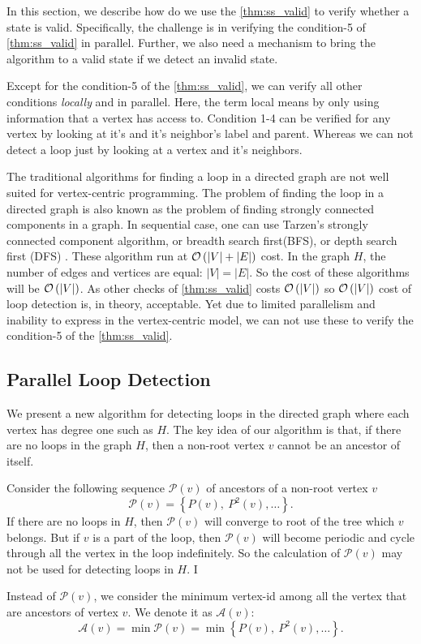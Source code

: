 %

In this section, we describe how do we use the  \cref{thm:ss_valid} to verify
whether a state is valid. Specifically, the challenge is in verifying the
condition-5 of \cref{thm:ss_valid} in parallel. Further, we also need a
mechanism to bring the algorithm to a valid state if we detect an invalid
state.


Except for the condition-5 of the \cref{thm:ss_valid}, we can verify all other
conditions \emph{locally} and in parallel.  Here, the term local means by only
using information that a vertex has access to. Condition 1-4 can be verified
for any vertex by looking at it's  and it's neighbor's label and parent.
Whereas we can not detect a loop just by looking at a vertex and it's
neighbors.

The traditional algorithms for finding a loop in a directed graph are not well
suited for vertex-centric programming. The problem of finding the loop in a
directed graph is also known as the problem of finding strongly connected
components in a graph. In sequential case, one can use Tarzen's strongly
connected component algorithm, or breadth search first(BFS), or depth search
first (DFS) .  These algorithm run at $\mathcal{O} \left ( |V| + |E| \right )$ cost.  In the
graph $H$, the number of edges and vertices are equal: $|V|=|E|$. So the cost
of these algorithms will be $\mathcal{O} \left ( |V|  \right )$. As other checks of
\cref{thm:ss_valid} costs $\mathcal{O} \left ( |V|  \right )$ so $\mathcal{O} \left ( |V|  \right )$ cost of loop
detection is, in theory, acceptable.  Yet due to limited parallelism and
inability to express in the vertex-centric model, we can not use these to
verify the condition-5 of the \cref{thm:ss_valid}.


\subsection{Parallel Loop Detection}

We present a new algorithm for detecting loops in the directed graph where
each vertex has degree one such as $H$. The key idea of our algorithm is that,
if there are no loops in the graph $H$, then a non-root vertex $v$ cannot be
an ancestor of itself.


Consider the following sequence $\mathcal{P}(v)$ of ancestors of a non-root vertex $v$ 
\begin{equation}
\mathcal{P}(v)=\left\{ P(v),\ P^{2}(v),\ldots\right\}. 
\end{equation}
%
If  there are no loops in $H$, then $\mathcal{P}(v)$ will converge to root of
the tree which $v$ belongs. But if $v$ is a part of the loop, then
$\mathcal{P}(v)$ will become periodic  and cycle through all the vertex in the
loop indefinitely.  So the calculation of  $\mathcal{P}(v)$ may not be used
for detecting loops in $H$.  I

Instead of $\mathcal{P}(v)$,  we consider the minimum vertex-id among all the
vertex that are ancestors of vertex $v$. We denote it as  $\mathcal{A}(v)$: 
\begin{equation}
\mathcal{A}(v) = \min\mathcal{P}(v)=\min\left\{ P(v),\ P^{2}(v),\ldots\right\}. 
\end{equation}


